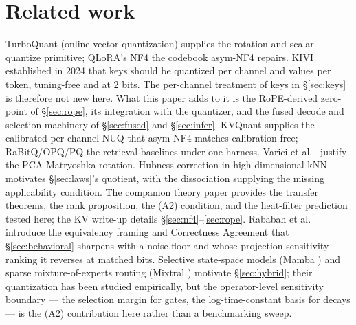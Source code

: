 \documentclass[11pt]{article}
\begin{document}
\section{Related work}\label{sec:related}
TurboQuant (online vector quantization) \cite{turboquantpaper} supplies the
rotation-and-scalar-quantize primitive; QLoRA's NF4 \cite{qlora} the
codebook asym-NF4 repairs. KIVI \cite{kivi} established in 2024 that keys
should be quantized per channel and values per token, tuning-free and at 2
bits. The per-channel treatment of keys in \S\ref{sec:keys} is therefore not
new here. What this paper adds to it is the RoPE-derived zero-point of
\S\ref{sec:rope}, its integration with the quantizer, and the fused decode and
selection machinery of \S\ref{sec:fused} and \S\ref{sec:infer}. KVQuant
\cite{kvquant} supplies the calibrated per-channel
NUQ that asym-NF4 matches calibration-free; RaBitQ/OPQ/PQ the retrieval
baselines under one harness. Varici et al.\ \cite{varici2025} justify the
PCA-Matryoshka rotation. Hubness correction in high-dimensional kNN
motivates \S\ref{sec:laws}'s quotient, with the dissociation supplying the
missing applicability condition. The companion theory paper \cite{kta}
provides the transfer theorems, the rank proposition, the (A2) condition,
and the heat-filter prediction tested here; the KV write-up \cite{kvtmlr}
details \S\ref{sec:nf4}--\ref{sec:rope}. Rababah et al.\ \cite{illusion}
introduce the equivalency framing and Correctness Agreement that
\S\ref{sec:behavioral} sharpens with a noise floor and whose
projection-sensitivity ranking it reverses at matched bits. Selective
state-space models (Mamba \cite{mamba}) and sparse mixture-of-experts routing
(Mixtral \cite{mixtral}) motivate \S\ref{sec:hybrid}; their quantization has been
studied empirically, but the operator-level sensitivity boundary --- the selection
margin for gates, the log-time-constant basis for decays --- is the (A2)
contribution here rather than a benchmarking sweep.
\end{document}
